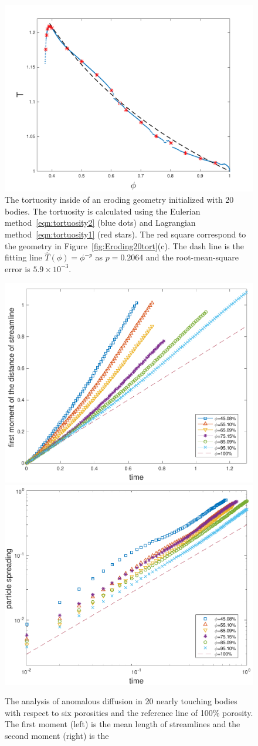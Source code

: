 \documentclass[preprint, 10pt]{elsarticle}
\begin{document}
\begin{figure}[H]
\center
\includegraphics*[width =0.5\linewidth]{./figs/tort_eulerian}
\caption{\label{fig:Eroding20tort_all} The tortuosity inside of an
eroding geometry initialized with 20 bodies.  The tortuosity is
calculated using the Eulerian method~\eqref{eqn:tortuosity2} (blue dots)
and Lagrangian method~\eqref{eqn:tortuosity1} (red stars).  The red
square correspond to the geometry in Figure~\ref{fig:Eroding20tort}(c).
The dash line is the fitting line $\widehat{T}(\phi)=\phi^{-p}$ as
$p=0.2064$ and the root-mean-square error is $5.9 \times 10^{-3}$.}
\end{figure}



\begin{figure}[H]
\includegraphics*[width =0.45\linewidth]{./figs/20b_first_moment}
\includegraphics*[width =0.45\linewidth]{./figs/20b_second_moment}
\caption{\label{fig:Eroding20anomalous} The analysis of anomalous
diffusion in 20 nearly touching bodies with respect to six porosities
and the reference line of 100\% porosity.  The first moment (left) is
the mean length of streamlines and the second moment (right) is the }
\end{figure}
\end{document}
